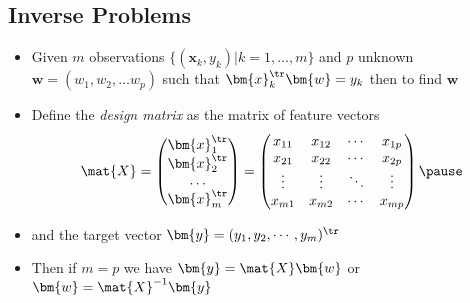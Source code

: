 \begin{slide}
\section{Inverse Problems}

\begin{PauseHighLight}
  \begin{itemize}
  \item Given $m$ observations $\{(\bm{x}_k, y_k)| k=1,\ldots,m\}$ and
    $p$ unknown $\bm{w}=(w_1,w_2, \ldots w_p)$ such that
    $\bm{x}_k^\tr \bm{w} = y_k$ then to find $\bm{w}$\pause
\item Define the \textit{design matrix} as the matrix of feature vectors
  \begin{displaymath}
    \mat{X} = 
    \begin{pmatrix}
      \bm{x}_1^\tr \\ \bm{x}_2^\tr \\ \hdots \\ \bm{x}_m^\tr
    \end{pmatrix} =
    \begin{pmatrix}
      x_{11} & x_{12} & \cdots & x_{1p}\\
      x_{21} & x_{22} & \cdots & x_{2p}\\
      \vdots & \vdots & \ddots & \vdots \\
      x_{m1} & x_{m2} & \cdots & x_{mp}
    \end{pmatrix}\pause
  \end{displaymath}
\item and the target vector $\bm{y} = (y_1, y_2, \cdots, y_m)^\tr$\pause
\item Then if $m=p$ we have $\bm{y} = \mat{X} \bm{w}$ or $\bm{w} =
  \mat{X}^{-1} \bm{y}$\pause
\end{itemize}

\end{PauseHighLight}
\end{slide}


